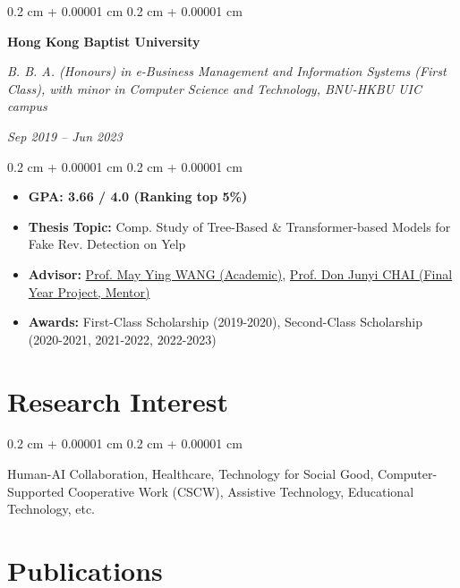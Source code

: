 \documentclass[10pt, letterpaper]{article}
\newenvironment{highlights}{
    \begin{itemize}[
        topsep=0.10 cm,
        parsep=0.10 cm,
        partopsep=0pt,
        itemsep=0pt,
        leftmargin=0.4 cm + 10pt
    ]
}{
    \end{itemize}
} %
\newenvironment{onecolentry}{
    \begin{adjustwidth}{
        0.2 cm + 0.00001 cm
    }{
        0.2 cm + 0.00001 cm
    }
}{
    \end{adjustwidth}
} %
\newenvironment{twocolentry}[2][]{
    \onecolentry
    \def\secondColumn{#2}
    \setcolumnwidth{\fill, 4.5 cm}
    \begin{paracol}{2}
}{
    \switchcolumn \raggedleft \secondColumn
    \end{paracol}
    \endonecolentry
} %
\let\hrefWithoutArrow\href
\renewcommand{\href}[2]{\hrefWithoutArrow{#1}{\ifthenelse{\equal{#2}{}}{ }{#2 }\raisebox{.15ex}{\footnotesize \faExternalLink*}}}
\renewcommand{\href}[2]{\hrefWithoutArrow{#1}{#2}}
\begin{document}
        \vspace{0.2 cm}

        \begin{twocolentry}{
        \textit{Sep 2019 – Jun 2023}}
            \textbf{Hong Kong Baptist University}

            \textit{B. B. A. (Honours) in e-Business Management and Information Systems (First Class), with minor in Computer Science and Technology, BNU-HKBU UIC campus}
        \end{twocolentry}

        \vspace{0.10 cm}
        \begin{onecolentry}
            \begin{highlights}
                \item \textbf{GPA: 3.66 / 4.0 (Ranking top 5\%)}
                \item \textbf{Thesis Topic:} Comp. Study of Tree-Based \& Transformer-based Models for Fake Rev. Detection on Yelp
                \item \textbf{Advisor:} \href{https://staff.uic.edu.cn/ywang/en}{Prof. May Ying WANG (Academic)}, \href{https://sites.google.com/view/chaijunyi/home}{Prof. Don Junyi CHAI (Final Year Project, Mentor)}
                \item \textbf{Awards:} First-Class Scholarship (2019-2020), Second-Class Scholarship (2020-2021, 2021-2022, 2022-2023)
            \end{highlights}
        \end{onecolentry}

    \section{Research Interest}

        \begin{onecolentry}
            Human-AI Collaboration, Healthcare, Technology for Social Good, Computer-Supported Cooperative Work (CSCW), Assistive Technology, Educational Technology, etc.

        \end{onecolentry}

    \section{Publications}
\end{document}
